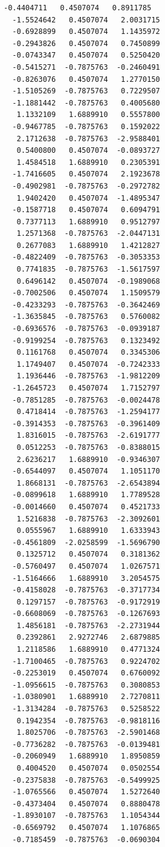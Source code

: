 \documentclass[11pt]{article}
\begin{document}
\begin{Verbatim}[commandchars=\\\{\}]
  -0.4404711   0.4507074   0.8911785
  -1.5524642   0.4507074   2.0031715
  -0.6928899   0.4507074   1.1435972
  -0.2943826   0.4507074   0.7450899
  -0.0743347   0.4507074   0.5250420
  -0.5415271  -0.7875763  -0.2460491
  -0.8263076   0.4507074   1.2770150
  -1.5105269  -0.7875763   0.7229507
  -1.1881442  -0.7875763   0.4005680
   1.1332109   1.6889910   0.5557800
  -0.9467785  -0.7875763   0.1592022
   2.1712638  -0.7875763  -2.9588401
   0.5400800   0.4507074  -0.0893727
   1.4584518   1.6889910   0.2305391
  -1.7416605   0.4507074   2.1923678
  -0.4902981  -0.7875763  -0.2972782
   1.9402420   0.4507074  -1.4895347
  -0.1587718   0.4507074   0.6094791
   0.7377113   1.6889910   0.9512797
   1.2571368  -0.7875763  -2.0447131
   0.2677083   1.6889910   1.4212827
  -0.4822409  -0.7875763  -0.3053353
   0.7741835  -0.7875763  -1.5617597
   0.6496142   0.4507074  -0.1989068
  -0.7002506   0.4507074   1.1509579
  -0.4233293  -0.7875763  -0.3642469
  -1.3635845  -0.7875763   0.5760082
  -0.6936576  -0.7875763  -0.0939187
  -0.9199254  -0.7875763   0.1323492
   0.1161768   0.4507074   0.3345306
   1.1749407   0.4507074  -0.7242333
   1.1936446  -0.7875763  -1.9812209
  -1.2645723   0.4507074   1.7152797
  -0.7851285  -0.7875763  -0.0024478
   0.4718414  -0.7875763  -1.2594177
  -0.3914353  -0.7875763  -0.3961409
   1.8316015  -0.7875763  -2.6191777
   0.0512253  -0.7875763  -0.8388015
   2.6236217   1.6889910  -0.9346307
  -0.6544097   0.4507074   1.1051170
   1.8668131  -0.7875763  -2.6543894
  -0.0899618   1.6889910   1.7789528
  -0.0014660   0.4507074   0.4521733
   1.5216838  -0.7875763  -2.3092601
   0.0555967   1.6889910   1.6333943
  -0.4561809  -2.0258599  -1.5696790
   0.1325712   0.4507074   0.3181362
  -0.5760497   0.4507074   1.0267571
  -1.5164666   1.6889910   3.2054575
  -0.4158028  -0.7875763  -0.3717734
   0.1297157  -0.7875763  -0.9172919
  -0.6608069  -0.7875763  -0.1267693
   1.4856181  -0.7875763  -2.2731944
   0.2392861   2.9272746   2.6879885
   1.2118586   1.6889910   0.4771324
  -1.7100465  -0.7875763   0.9224702
  -0.2253019   0.4507074   0.6760092
  -1.0956615  -0.7875763   0.3080853
  -1.0380901   1.6889910   2.7270811
  -1.3134284  -0.7875763   0.5258522
   0.1942354  -0.7875763  -0.9818116
   1.8025706  -0.7875763  -2.5901468
  -0.7736282  -0.7875763  -0.0139481
  -0.2060949   1.6889910   1.8950859
   0.4004520   0.4507074   0.0502554
  -0.2375838  -0.7875763  -0.5499925
  -1.0765566   0.4507074   1.5272640
  -0.4373404   0.4507074   0.8880478
  -1.8930107  -0.7875763   1.1054344
  -0.6569792   0.4507074   1.1076865
  -0.7185459  -0.7875763  -0.0690304

\end{Verbatim}
\end{document}
